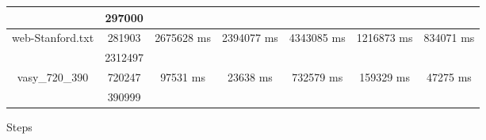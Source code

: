 \documentclass[../master/master.tex]{subfiles}
\begin{document}
\begin{center}
\begin{tabular}{ |c|c||c||c||c||c||c|| }
\cline{2-2}
 & 297000  & & & & & \\
\hline
\multirow{2}{3.8em}{web-Stanford.txt} & 281903 & \multirow{2}{3.8em}{2675628 ms} & \multirow{2}{3.8em}{2394077 ms} & \multirow{2}{3.8em}{4343085 ms} & \multirow{2}{3.8em}{1216873 ms} & \multirow{2}{3.8em}{834071 ms} \\
\cline{2-2}
 & 2312497  & & & & & \\
\hline
\multirow{2}{3.8em}{vasy\_720\_390} & 720247 & \multirow{2}{3.8em}{97531 ms} & \multirow{2}{3.8em}{23638 ms} & \multirow{2}{3.8em}{732579 ms} & \multirow{2}{3.8em}{159329 ms} & \multirow{2}{3.8em}{47275 ms} \\
\cline{2-2}
 & 390999  & & & & & \\
\hline
\end{tabular}
\end{center}
Steps
\end{document}

